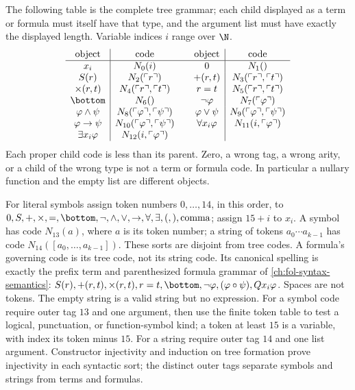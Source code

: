The following table is the complete tree grammar; each child displayed as a
term or formula must itself have that type, and the argument list must have
exactly the displayed length.  Variable indices \(i\) range over \(\N\).
\[
\begin{array}{c|c@{\qquad}c|c}
 \text{object}&\text{code}&\text{object}&\text{code}\\\hline
 x_i&N_0(i)&0&N_1()\\
 S(r)&N_2(\ulcorner r\urcorner)&+(r,t)&N_3(\ulcorner r\urcorner,\ulcorner t\urcorner)\\
 \times(r,t)&N_4(\ulcorner r\urcorner,\ulcorner t\urcorner)&r=t&N_5(\ulcorner r\urcorner,\ulcorner t\urcorner)\\
 \bottom&N_6()&\neg\varphi&N_7(\ulcorner\varphi\urcorner)\\
 \varphi\land\psi&N_8(\ulcorner\varphi\urcorner,\ulcorner\psi\urcorner)&
 \varphi\lor\psi&N_9(\ulcorner\varphi\urcorner,\ulcorner\psi\urcorner)\\
 \varphi\to\psi&N_{10}(\ulcorner\varphi\urcorner,\ulcorner\psi\urcorner)&
 \forall x_i\varphi&N_{11}(i,\ulcorner\varphi\urcorner)\\
 \exists x_i\varphi&N_{12}(i,\ulcorner\varphi\urcorner)&&
\end{array}
\]
Each proper child code is less than its parent.  Zero, a wrong tag, a wrong
arity, or a child of the wrong type is not a term or formula code.  In
particular a nullary function and the empty list are different objects.

For literal symbols assign token numbers \(0,\ldots,14\), in this order,
to \(0,S,+,\times,=,\bottom,\neg,\land,\lor,\to,\forall,\exists,(,),\text{comma}\);
assign \(15+i\) to \(x_i\).  A symbol has code \(N_{13}(a)\), where
\(a\) is its token number; a string of tokens \(a_0\cdots a_{k-1}\)
has code \(N_{14}([a_0,\ldots,a_{k-1}])\).  These sorts are disjoint
from tree codes.  A formula's governing code is its tree code, not its
string code.  Its canonical spelling is exactly the prefix term and
parenthesized formula grammar of \cref{ch:fol-syntax-semantics}:
\(S(r),+(r,t),\times(r,t),r=t,\bottom,\neg\varphi,
(\varphi\mathbin\circ\psi),Qx_i\varphi\).
Spaces are not tokens.  The empty string is a valid string but no expression.
For a symbol code require outer tag \(13\) and one argument, then use the
finite token table to test a logical, punctuation, or function-symbol kind;
a token at least \(15\) is a variable, with index its token minus \(15\).
For a string require outer tag \(14\) and one list argument.  Constructor
injectivity and induction on tree formation prove injectivity in each
syntactic sort; the distinct outer tags separate symbols and strings from
terms and formulas.

